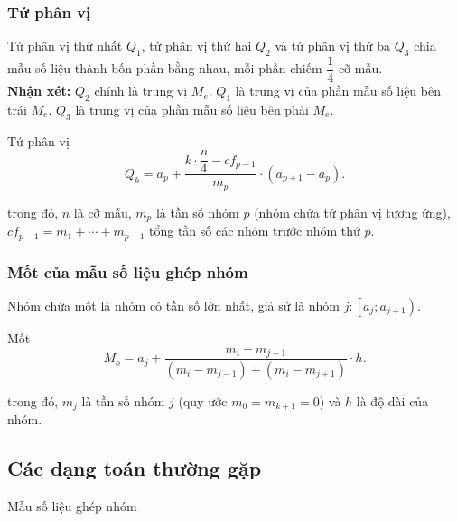 \subsubsection{Tứ phân vị} 
Tứ phân vị thứ nhất $Q_1$, tứ phân vị thứ hai $Q_2$ và tứ phân vị thứ ba $Q_3$ chia mẫu số liệu thành bốn phần bằng nhau, mỗi phần chiếm $\dfrac{1}{4}$ cỡ mẫu.\\
\textbf{Nhận xét:} $Q_2$ chính là trung vị $M_e$. $Q_1$ là trung vị của phần mẫu số liệu bên trái $M_e$. $Q_3$ là trung vị của phần mẫu số liệu bên phải $M_e$.\\
\begin{khung4}{Tứ phân vị}
	$$Q_k=a_p+\dfrac{k \cdot \dfrac{n}{4}-cf_{p-1}}{m_p}\cdot \left(a_{p+1}-a_p\right).$$
\end{khung4}

trong đó, $n$ là cỡ mẫu, $m_p$ là tần số nhóm $p$ (nhóm chứa tứ phân vị tương ứng), $cf_{p-1}=m_1 + \cdots + m_{p-1}$ tổng tần số các nhóm trước nhóm thứ $p$.

\subsubsection{Mốt của mẫu số liệu ghép nhóm}
Nhóm chứa mốt là nhóm có tần số lớn nhất, giả sử là nhóm $j:\left[a_j;a_{j+1} \right)$.
\begin{khung4}{Mốt}
	$$M_o=a_j+\dfrac{m_i-m_{j-1}}{\left(m_i-m_{j-1}\right)+\left(m_i-m_{j+1}\right)}\cdot h.$$
\end{khung4}
trong đó, $m_j$ là tần số nhóm $j$ (quy ước $m_0=m_{k+1}=0$) và $h$ là độ dài của nhóm.
\setcounter{subsubsection}{0}
\setcounter{ex}{0}
\setcounter{bt}{0}
\subsection{Các dạng toán thường gặp}
\begin{dang}{Mẫu số liệu ghép nhóm}
\end{dang}
